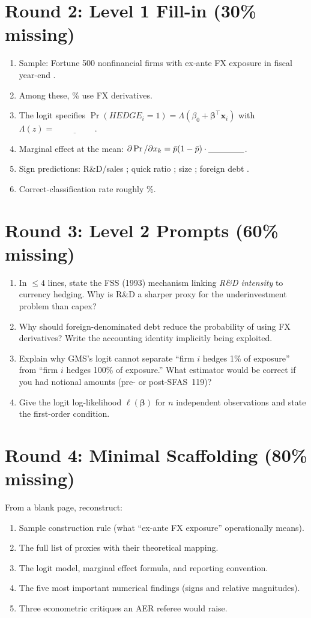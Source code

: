\documentclass[11pt]{article}
\newcommand{\blank}[1]{\underline{\hspace{#1}}}
\begin{document}
\section*{Round 2: Level 1 Fill-in (30\% missing)}
\begin{enumerate}
\item Sample: \blank{1.5cm} Fortune 500 nonfinancial firms with ex-ante FX exposure in fiscal year-end \blank{1.5cm}.
\item Among these, \blank{1cm}\% use FX derivatives.
\item The logit specifies $\Pr(HEDGE_i=1)=\Lambda(\beta_0+\bm\beta^\top \mathbf x_i)$ with $\Lambda(z)=\blank{2cm}$.
\item Marginal effect at the mean: $\partial\Pr/\partial x_k=\bar p(1-\bar p)\cdot\blank{1.5cm}$.
\item Sign predictions: R\&D/sales \blank{0.8cm}; quick ratio \blank{0.8cm}; size \blank{0.8cm}; foreign debt \blank{0.8cm}.
\item Correct-classification rate roughly \blank{1cm}\%.
\end{enumerate}

\section*{Round 3: Level 2 Prompts (60\% missing)}
\begin{enumerate}
\item In $\le 4$ lines, state the FSS (1993) mechanism linking \emph{R\&D intensity} to currency hedging. Why is R\&D a sharper proxy for the underinvestment problem than capex?
\item Why should foreign-denominated debt reduce the probability of using FX derivatives? Write the accounting identity implicitly being exploited.
\item Explain why GMS's logit cannot separate ``firm $i$ hedges 1\% of exposure'' from ``firm $i$ hedges 100\% of exposure.'' What estimator would be correct if you had notional amounts (pre- or post-SFAS~119)?
\item Give the logit log-likelihood $\ell(\bm\beta)$ for $n$ independent observations and state the first-order condition.
\end{enumerate}

\section*{Round 4: Minimal Scaffolding (80\% missing)}
From a blank page, reconstruct:
\begin{enumerate}
\item Sample construction rule (what ``ex-ante FX exposure'' operationally means).
\item The full list of proxies with their theoretical mapping.
\item The logit model, marginal effect formula, and reporting convention.
\item The five most important numerical findings (signs and relative magnitudes).
\item Three econometric critiques an AER referee would raise.
\end{enumerate}
\end{document}
